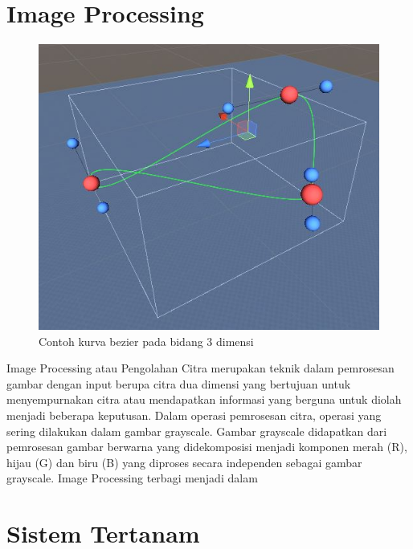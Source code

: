 \section{Image Processing}
\vspace{1ex}

\begin{figure} [H]
	\captionsetup{justification=centering}
	\includegraphics[scale=0.2]{img/contoh-kurva-bezier.JPG}
	\caption{Contoh kurva bezier pada bidang 3 dimensi}
	\label{fig:2.1}
\end{figure}

Image Processing atau Pengolahan Citra merupakan teknik
dalam pemrosesan gambar dengan input berupa citra dua dimensi yang bertujuan untuk menyempurnakan citra atau mendapatkan
informasi yang berguna untuk diolah menjadi beberapa keputusan. Dalam operasi pemrosesan citra, operasi yang sering dilakukan
dalam gambar grayscale. Gambar grayscale didapatkan dari pemrosesan gambar berwarna yang didekomposisi menjadi komponen
merah (R), hijau (G) dan biru (B) yang diproses secara independen
sebagai gambar grayscale. Image Processing terbagi menjadi dalam
\vspace{1ex}

\section{Sistem Tertanam}
\vspace{1ex}

